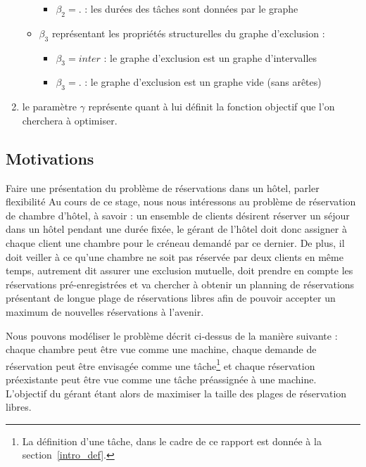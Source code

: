 \documentclass[a4paper,9pt]{report}
\begin{document}
\begin{enumerate}
\begin{itemize}[label=$\bullet$]
\begin{itemize}
                    \item $\beta_2 = .$ : les durées des tâches sont données par le graphe
                \end{itemize}
            \item $\beta_3$ représentant les propriétés structurelles du graphe d'exclusion :
                \begin{itemize}
                    \item $\beta_3 = inter$ : le graphe d'exclusion est un graphe d'intervalles
                    \item $\beta_3 = .$ : le graphe d'exclusion est un graphe vide (sans arêtes)
                \end{itemize}
        \end{itemize}
    \item le paramètre $\gamma$ représente quant à lui définit la fonction objectif que l'on
        cherchera à optimiser.
\end{enumerate}

\subsection{Motivations}

Faire une présentation du problème de réservations dans un hôtel, parler flexibilité
Au cours de ce stage, nous nous intéressons au problème de réservation de chambre d'hôtel, à savoir : un
ensemble de clients désirent réserver un séjour dans un hôtel pendant une durée fixée, le gérant de
l'hôtel doit donc assigner à chaque client une chambre pour le créneau demandé par ce dernier. De
plus, il doit veiller à ce qu'une chambre ne soit pas réservée par deux clients en même temps,
autrement dit assurer une exclusion mutuelle, doit
prendre en compte les réservations pré-enregistrées et va chercher à obtenir un planning de
réservations présentant de longue plage de réservations libres afin de pouvoir accepter un maximum
de nouvelles réservations à l'avenir.

Nous pouvons modéliser le problème décrit ci-dessus de la manière suivante : chaque
chambre peut être vue comme une machine, chaque demande de réservation peut être envisagée comme une
tâche\footnote{La définition d'une tâche, dans le cadre de ce rapport est donnée à la
section~\ref{intro_def}.} et chaque réservation préexistante peut être vue comme une tâche
préassignée à une machine. L'objectif du gérant étant alors de maximiser la taille des plages de
réservation libres.
\end{document}
